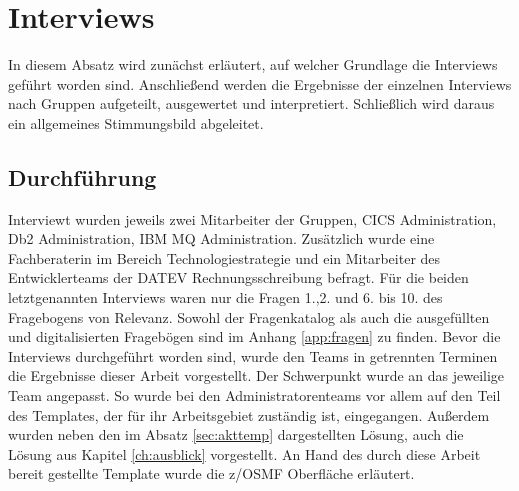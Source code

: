 \section{Interviews}
In diesem Absatz wird zunächst erläutert, auf welcher Grundlage die Interviews geführt worden sind.
Anschließend werden die Ergebnisse der einzelnen Interviews nach Gruppen aufgeteilt, ausgewertet und interpretiert.
Schließlich wird daraus ein allgemeines Stimmungsbild abgeleitet.

\subsection{Durchführung}
Interviewt wurden jeweils zwei Mitarbeiter der Gruppen, CICS Administration, Db2 Administration, IBM MQ Administration.
Zusätzlich wurde eine Fachberaterin im Bereich Technologiestrategie und ein Mitarbeiter des Entwicklerteams der DATEV Rechnungsschreibung befragt.
Für die beiden letztgenannten Interviews waren nur die Fragen 1.,2. und 6. bis 10. des Fragebogens von Relevanz.
Sowohl der Fragenkatalog als auch die ausgefüllten und digitalisierten Fragebögen sind im Anhang \ref{app:fragen} zu finden.
Bevor die Interviews durchgeführt worden sind, wurde den Teams in getrennten Terminen die Ergebnisse dieser Arbeit vorgestellt.
Der Schwerpunkt wurde an das jeweilige Team angepasst.
So wurde bei den Administratorenteams vor allem auf den Teil des Templates, der für ihr Arbeitsgebiet zuständig ist, eingegangen.
Außerdem wurden neben den im Absatz \ref{sec:akttemp} dargestellten Lösung, auch die Lösung aus Kapitel \ref{ch:ausblick} vorgestellt.
An Hand des durch diese Arbeit bereit gestellte Template wurde die z/OSMF Oberfläche erläutert.

